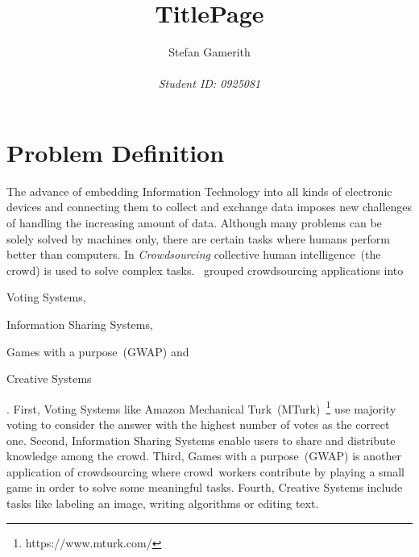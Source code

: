 \documentclass[12pt, notitlepage]{article}
\title{TitlePage}
\author{Stefan Gamerith\\\\
		\emph{Student ID: 0925081}}
\begin{document}
	\maketitle
	\thispagestyle{empty}
	\newpage
\setcounter{page}{1}

\section{Problem Definition}
The advance of embedding Information Technology into all kinds of electronic devices and connecting them to collect and exchange data imposes new challenges of handling the increasing amount of data. Although many problems can be solely solved by machines only, there are certain tasks where humans perform better than computers. In \emph{Crowdsourcing} collective human intelligence~(the crowd) is used to solve complex tasks. \citet{yuen2011survey}~grouped crowdsourcing applications into 
\begin{inparaenum}[1)]
		\item Voting Systems,
		\item Information Sharing Systems,
		\item Games with a purpose~(GWAP) and
		\item Creative Systems
\end{inparaenum}. 
First, Voting Systems like Amazon Mechanical Turk~(MTurk)~\footnote{https://www.mturk.com/} use majority voting to consider the answer with the highest number of votes as the correct one. Second, Information Sharing Systems enable users to share and distribute knowledge among the crowd. Third, Games with a purpose~(GWAP) is another application of crowdsourcing where crowd~workers contribute by playing a small game in order to solve some meaningful tasks. Fourth, Creative Systems include tasks like labeling an image, writing algorithms or editing text. 
\end{document}
